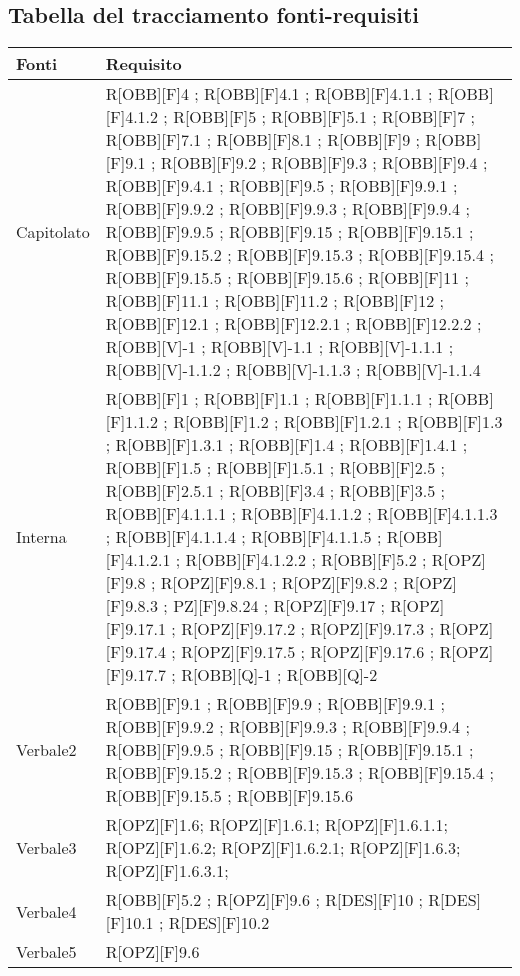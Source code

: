 \subsection{Tabella del tracciamento fonti-requisiti}
	\begin{table}[H]
		\centering
		\begin{tabular}{|p{}|p{}|}
			\toprule
			
			\textbf{Fonti} & \textbf{Requisito} \\
			
			\midrule

			Capitolato & R[OBB][F]4 ; R[OBB][F]4.1 ; R[OBB][F]4.1.1 ; R[OBB][F]4.1.2 ; R[OBB][F]5 ; R[OBB][F]5.1 ; R[OBB][F]7 ; R[OBB][F]7.1 ; R[OBB][F]8.1 ; R[OBB][F]9 ; R[OBB][F]9.1 ; R[OBB][F]9.2 ; R[OBB][F]9.3 ; R[OBB][F]9.4 ; R[OBB][F]9.4.1 ; R[OBB][F]9.5 ; R[OBB][F]9.9.1 ; R[OBB][F]9.9.2 ; R[OBB][F]9.9.3 ; R[OBB][F]9.9.4 ; R[OBB][F]9.9.5 ; R[OBB][F]9.15 ; R[OBB][F]9.15.1 ; R[OBB][F]9.15.2 ; R[OBB][F]9.15.3 ; R[OBB][F]9.15.4 ; R[OBB][F]9.15.5 ; R[OBB][F]9.15.6 ; R[OBB][F]11 ; R[OBB][F]11.1 ; R[OBB][F]11.2 ;  R[OBB][F]12 ; R[OBB][F]12.1 ; R[OBB][F]12.2.1 ; R[OBB][F]12.2.2 ; R[OBB][V]-1 ; R[OBB][V]-1.1 ; R[OBB][V]-1.1.1 ; R[OBB][V]-1.1.2 ; R[OBB][V]-1.1.3 ; R[OBB][V]-1.1.4 \\ \midrule

			Interna & R[OBB][F]1 ; R[OBB][F]1.1 ; R[OBB][F]1.1.1 ; R[OBB][F]1.1.2 ; R[OBB][F]1.2 ; R[OBB][F]1.2.1 ; R[OBB][F]1.3 ; R[OBB][F]1.3.1 ;  R[OBB][F]1.4 ; R[OBB][F]1.4.1 ; R[OBB][F]1.5 ; R[OBB][F]1.5.1 ; R[OBB][F]2.5 ; R[OBB][F]2.5.1 ; R[OBB][F]3.4 ; R[OBB][F]3.5 ; R[OBB][F]4.1.1.1 ; R[OBB][F]4.1.1.2 ; R[OBB][F]4.1.1.3 ; R[OBB][F]4.1.1.4 ; R[OBB][F]4.1.1.5 ; R[OBB][F]4.1.2.1 ; R[OBB][F]4.1.2.2 ; R[OBB][F]5.2 ; R[OPZ][F]9.8 ; R[OPZ][F]9.8.1 ; R[OPZ][F]9.8.2 ; R[OPZ][F]9.8.3 ; PZ][F]9.8.24 ; R[OPZ][F]9.17 ; R[OPZ][F]9.17.1 ; R[OPZ][F]9.17.2 ; R[OPZ][F]9.17.3 ; R[OPZ][F]9.17.4 ; R[OPZ][F]9.17.5 ; R[OPZ][F]9.17.6 ; R[OPZ][F]9.17.7 ; R[OBB][Q]-1 ; R[OBB][Q]-2 \\ \midrule
			
			Verbale2 & R[OBB][F]9.1 ; R[OBB][F]9.9 ; R[OBB][F]9.9.1 ; R[OBB][F]9.9.2 ; R[OBB][F]9.9.3 ; R[OBB][F]9.9.4 ; R[OBB][F]9.9.5 ; R[OBB][F]9.15 ; R[OBB][F]9.15.1 ; R[OBB][F]9.15.2 ; R[OBB][F]9.15.3 ; R[OBB][F]9.15.4 ; R[OBB][F]9.15.5 ; R[OBB][F]9.15.6 \\ \midrule
			Verbale3 & R[OPZ][F]1.6; R[OPZ][F]1.6.1; R[OPZ][F]1.6.1.1; R[OPZ][F]1.6.2; R[OPZ][F]1.6.2.1; R[OPZ][F]1.6.3; R[OPZ][F]1.6.3.1; \\ \midrule
			Verbale4 & R[OBB][F]5.2 ; R[OPZ][F]9.6 ; R[DES][F]10 ; R[DES][F]10.1 ; R[DES][F]10.2 \\ \midrule
			Verbale5 & R[OPZ][F]9.6  \\ \midrule

		\end{tabular}
	\end{table}

